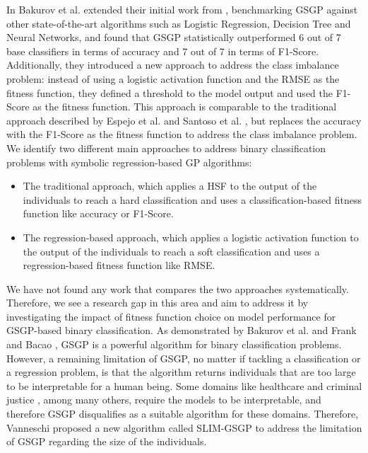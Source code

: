 \documentclass[manuscript, review, anonymous]{acmart} %
\begin{document}
In \cite{Bakurov2022} Bakurov et al. extended their initial work from \cite{Bakurov2019}, benchmarking GSGP against other state-of-the-art algorithms such as
Logistic Regression, Decision Tree and Neural Networks,
and found that GSGP statistically outperformed 6 out of 7 base classifiers in terms of accuracy and 7 out of 7 in terms of F1-Score.
Additionally, they introduced a new approach to address the class imbalance problem: instead of using a logistic activation function and the
RMSE as the fitness function, they defined a threshold to the model output and used the F1-Score as the fitness function.
This approach is comparable to the traditional approach described by Espejo et al. \cite{Espejo2010} and Santoso et al. \cite{Santoso2021}, but replaces
the accuracy with the F1-Score as the fitness function to address the class imbalance problem.\\
We identify two different main approaches
to address binary classification problems with symbolic regression-based GP algorithms:
\begin{itemize}
    \item The traditional approach, which applies a HSF to the output of the individuals to reach a hard classification and uses a classification-based fitness function like accuracy or F1-Score.
    \item The regression-based approach, which applies a logistic activation function to the output of the individuals to reach a soft classification and uses a regression-based fitness function like RMSE.
\end{itemize}
We have not found any work that compares the two approaches systematically. 
Therefore, we see a research gap in this area and aim to address it by investigating 
the impact of fitness function choice on model performance for GSGP-based binary classification.
As demonstrated by Bakurov et al. \cite{Bakurov2022} and Frank and Bacao \cite{Frank2023}, GSGP is a powerful algorithm for binary classification problems.
However, a remaining limitation of GSGP, no matter if tackling a classification or a regression problem,
is that the algorithm returns individuals that are too large to be interpretable for a human being.
Some domains like healthcare and criminal justice \cite{Rudin2019}, among many others, require the models to be interpretable,
and therefore GSGP disqualifies as a suitable algorithm for these domains.
Therefore, Vanneschi \cite{Vanneschi2024} proposed a new algorithm called SLIM-GSGP to address 
the limitation of GSGP regarding the size of the individuals.
\end{document}
